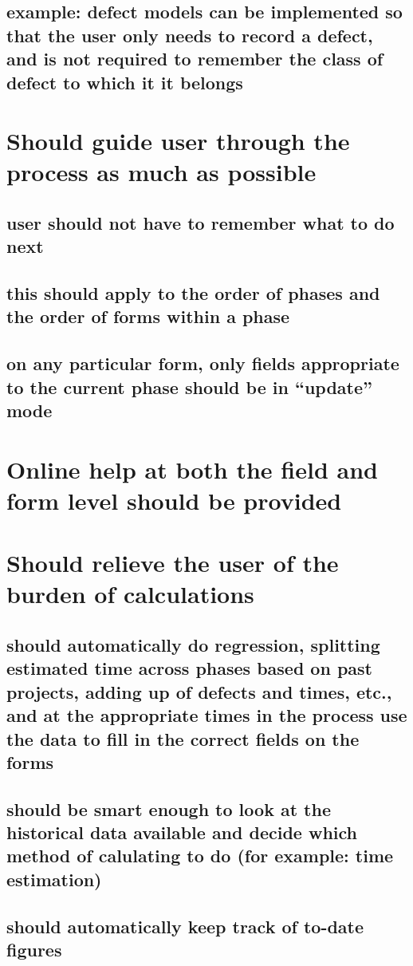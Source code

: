 \subsection{example: defect models can be implemented so that the user only
needs to record a defect, and is not required to remember the class of
defect to which it it belongs}
\section{Should guide user through the process as much as possible}
\subsection{user should not have to remember what to do next}
\subsection{this should apply to the order of phases and the order of forms
within a phase}
\subsection{on any particular form, only fields appropriate to the current
phase should be in ``update'' mode}
\section{Online help at both the field and form level should be provided}
\section{Should relieve the user of the burden of calculations}
\subsection{should automatically do regression, splitting estimated time
across phases based on past projects, adding up of defects and times, etc.,
and at the appropriate times in the process use the data to fill in the
correct fields on the forms}
\subsection{should be smart enough to look at the historical data available and decide
which method of calulating to do (for example: time estimation)}
\subsection{should automatically keep track of to-date figures}
